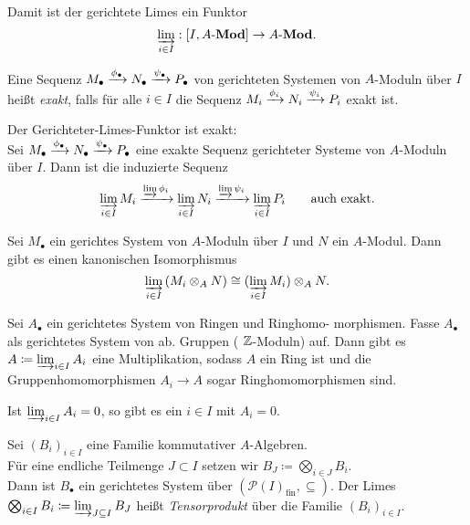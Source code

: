 \documentclass{cheat-sheet}
\newcommand{\PS}{\mathcal{P}} %
\newcommand{\Mod}{\mathbf{Mod}} %
\newcommand{\LMod}[1]{{#1}\text{-}\Mod} %
\begin{document}
\begin{bem}
  Damit ist der gerichtete Limes ein Funktor
  \[
    \varinjlim_{i \in I} : [I, \LMod{A}] \to \LMod{A}.
  \]
\end{bem}

\begin{defn}
  Eine Sequenz $M_\bullet \xrightarrow{\phi_\bullet} N_\bullet \xrightarrow{\psi_\bullet} P_\bullet$ von gerichteten Systemen von $A$-Moduln über $I$ heißt \emph{exakt}, falls für alle $i \in I$ die Sequenz $M_i \xrightarrow{\phi_i} N_i \xrightarrow{\psi_i} P_i$ exakt ist.
\end{defn}

\begin{prop}
  Der Gerichteter-Limes-Funktor ist exakt: \\
  Sei $M_\bullet \xrightarrow{\phi_\bullet} N_\bullet \xrightarrow{\psi_\bullet} P_\bullet$ eine exakte Sequenz gerichteter Systeme von $A$-Moduln über $I$.
  Dann ist die induzierte Sequenz
  \[
    \varinjlim_{i \in I} M_i \xrightarrow{\varinjlim \phi_i}
    \varinjlim_{i \in I} N_i \xrightarrow{\varinjlim \psi_i}
    \varinjlim_{i \in I} P_i
    \qquad \text{auch exakt.}
  \]
\end{prop}


\begin{prop}
  Sei $M_\bullet$ ein gerichtes System von $A$-Moduln über $I$ und $N$ ein $A$-Modul.
  Dann gibt es einen kanonischen Isomorphismus
  \[
    \varinjlim_{i \in I} \, (M_i \otimes_A N) \cong ( \varinjlim_{i \in I} M_i) \otimes_A N.
  \]
\end{prop}


\begin{prop}
  Sei $A_\bullet$ ein gerichtetes System von Ringen und Ringhomo- morphismen.
  Fasse $A_\bullet$ als gerichtetes System von ab. Gruppen (\dh{} $\mathbb{Z}$-Moduln) auf.
  Dann gibt es $A \coloneqq \varinjlim_{i \in I} A_i$ eine Multiplikation, sodass $A$ ein Ring ist und die Gruppenhomomorphismen $A_i \to A$ sogar Ringhomomorphismen sind.
\end{prop}

\begin{prop}
  Ist $\varinjlim_{i \in I} A_i = 0$, so gibt es ein $i \in I$ mit $A_i = 0$.
\end{prop}

\begin{defn}
  Sei $(B_i)_{i \in I}$ eine Familie kommutativer $A$-Algebren. \\
  Für eine endliche Teilmenge $J \subset I$ setzen wir $B_J \coloneqq \bigotimes_{i \in J} B_i$. \\
  Dann ist $B_\bullet$ ein gerichtetes System über $(\PS(I)_{\text{fin}}, \subseteq)$.
  Der Limes $\bigotimes_{i \in I} B_i \coloneqq \varinjlim_{J \subseteq I} B_J$ heißt \emph{Tensorprodukt} über die Familie $(B_i)_{i \in I}$.
\end{defn}
\end{document}

